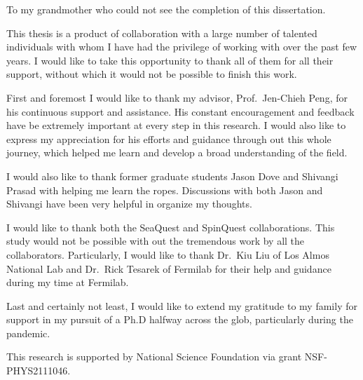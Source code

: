 \documentclass[../main.tex]{subfiles}
\begin{document}
\begin{dedication}
	To my grandmother who could not see the completion of this dissertation.
\end{dedication}

\begin{acknowledgments}
	This thesis is a product of collaboration with a large number of talented
	individuals with whom I have had the privilege of working with over the past
	few years. I would like to take this opportunity to thank all of them for all
	their support, without which it would not be possible to finish this work.

	First and foremost I would like to thank my advisor, Prof.~Jen-Chieh Peng, for
	his continuous support and assistance. His constant encouragement and feedback
	have be extremely important at every step in this research.
	I would also like to express my	appreciation for his efforts and guidance
	through out this whole journey, which helped me learn and develop a broad
	understanding of the field.

	I would also like to thank former graduate students Jason Dove and Shivangi
	Prasad with helping me learn the ropes. Discussions with both Jason and
	Shivangi have been very helpful in organize my thoughts.

	I would like to thank both the SeaQuest and SpinQuest collaborations.
	This study would not be possible with out the tremendous work by all the
	collaborators. Particularly, I would like to thank Dr.~Kiu Liu of Los Almos
	National Lab and Dr.~Rick Tesarek of Fermilab for their help and guidance during
	my time at Fermilab.

	Last and certainly not least, I would like to extend my gratitude to my family
	for support in my pursuit of a Ph.D halfway across the glob, particularly
	during the pandemic.

	This research is supported by National Science Foundation via grant NSF-PHYS2111046.

\end{acknowledgments}
\end{document}
